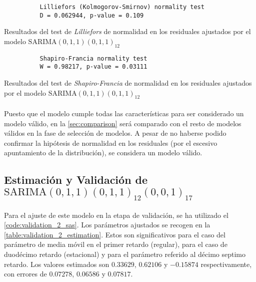 \documentclass[a4paper, spanish]{article}
\begin{document}
      \begin{table}[htb!]
        \begin{Verbatim}
          Lilliefors (Kolmogorov-Smirnov) normality test
          D = 0.062944, p-value = 0.109
        \end{Verbatim}
        \caption{Resultados del test de \emph{Lilliefors} de normalidad en los residuales ajustados por el modelo $\text{SARIMA}(0, 1, 1)(0, 1, 1)_{12}$}
        \label{result:comparison_1_lilliefors}
      \end{table}

      \begin{table}[htb!]
        \begin{Verbatim}
          Shapiro-Francia normality test
          W = 0.98217, p-value = 0.03111
        \end{Verbatim}
        \caption{Resultados del test de \emph{Shapiro-Francia} de normalidad en los residuales ajustados por el modelo $\text{SARIMA}(0, 1, 1)(0, 1, 1)_{12}$}
        \label{result:comparison_1_sf}
      \end{table}

      \paragraph{}
      Puesto que el modelo cumple todas las características para ser considerado un modelo válido, en la \autoref{sec:comparison} será comparado con el resto de modelos válidos en la fase de selección de modelos. A pesar de no haberse podido confirmar la hipótesis de normalidad en los residuales (por el escesivo apuntamiento de la distribución), se considera un modelo válido.

    \subsection{Estimación y Validación de \textbf{$\text{SARIMA}(0, 1, 1)(0, 1, 1)_{12}(0, 0, 1)_{17}$}}
    \label{sec:fitting_2}

      \paragraph{}
      Para el ajuste de este modelo en la etapa de validación, se ha utilizado el \autoref{code:validation_2_sas}. Los parámetros ajustados se recogen en la \autoref{table:validation_2_estimation}. Estos son significativos para el caso del parámetro de media móvil en el primer retardo (regular), para el caso de duodécimo retardo (estacional) y para el parámetro referido al décimo septimo retardo. Los valores estimados son $0.33629$, $0.62106$ y $-0.15874$ respectivamente, con errores de $0.07278$, $0.06586$ y $0.07817$.
\end{document}
